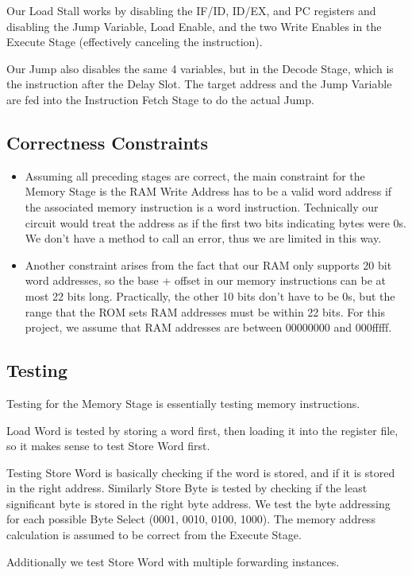 \documentclass{article}
\begin{document}
Our Load Stall works by disabling the IF/ID, ID/EX, and PC registers and disabling the Jump Variable, Load Enable, and the two Write Enables in the Execute Stage (effectively canceling the instruction). 

Our Jump also disables the same 4 variables, but in the Decode Stage, which is the instruction after the Delay Slot. The target address and the Jump Variable are fed into the Instruction Fetch Stage to do the actual Jump.

\subsection{Correctness Constraints}
\begin{itemize}
\item
Assuming all preceding stages are correct, the main constraint for the Memory Stage is the RAM Write Address has to be a valid word address if the associated memory instruction is a word instruction. Technically our circuit would treat the address as if the first two bits indicating bytes were 0s. We don't have a method to call an error, thus we are limited in this way.
\item
Another constraint arises from the fact that our RAM only supports 20 bit word addresses, so the base + offset in our memory instructions can be at most 22 bits long. Practically, the other 10 bits don't have to be 0s, but the range that the ROM sets RAM addresses must be within 22 bits. For this project, we assume that RAM addresses are between 00000000 and 000fffff. 
\end{itemize}

\subsection{Testing}
Testing for the Memory Stage is essentially testing memory instructions.

Load Word is tested by storing a word first, then loading it into the register file, so it makes sense to test Store Word first.

Testing Store Word is basically checking if the word is stored, and if it is stored in the right address. Similarly Store Byte is tested by checking if the least significant byte is stored in the right byte address. We test the byte addressing for each possible Byte Select (0001, 0010, 0100, 1000). The memory address calculation is assumed to be correct from the Execute Stage. 

Additionally we test Store Word with multiple forwarding instances.
\end{document}
